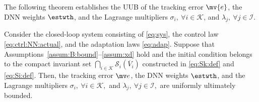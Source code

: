 \documentclass[letterpaper, journal, twoside]{IEEEtran}
\begin{document}
The following theorem establishes the UUB of the tracking error $\mv{e}$, the DNN weights $\estwth$, and the Lagrange multipliers $\sigma_i,\ \forall i \in \mathcal{K}$, and $\lambda_j,\ \forall j \in \mathcal{I}$.

\begin{theorem} \label{thm:stability}
  Consider the closed-loop system consisting of \eqref{eq:sys}, the control law \eqref{eq:ctrl:NN:actual}, and the adaptation laws \eqref{eq:adap}.
  Suppose that Assumptions~\ref{assum:B:bound}--\ref{assum:xd} hold and the initial condition belongs to the compact invariant set 
  $
  \bigcap_{i\in\mathcal K}
  \mathcal S_i(\overline V_i)
  $ 
  constructed in \eqref{eq:Sk:def} and \eqref{eq:Si:def}.
  Then, the tracking error $\mv e$, the DNN weights $\estwth$, and the Lagrange multipliers $\sigma_i,\ \forall i \in \mathcal{K},$ and $\lambda_j,\ \forall j \in \mathcal{I},$ are uniformly ultimately bounded.
\end{theorem}
\end{document}
